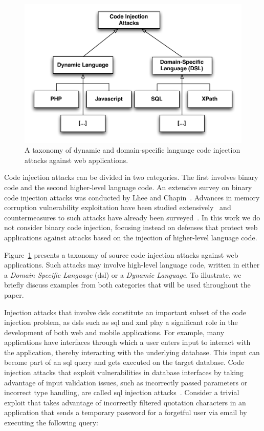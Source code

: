 \documentclass[conference]{IEEEtran}
\begin{document}
\begin{figure}
\begin{center}
\leavevmode
\includegraphics[width=\columnwidth]{attack-tree-uml.pdf}
\end{center}
\caption{\label{fig:taxonomy}A taxonomy of dynamic and domain-specific
language code injection attacks against web applications.}
\end{figure}

Code injection attacks can be divided in two categories. The first
involves binary code and the second higher-level language code. An
extensive survey on binary code injection attacks was conducted by
Lhee and Chapin~\cite{LC03}. Advances in memory corruption vulnerability
exploitation have been studied extensively~\cite{PB04, SPWS13}
and countermeasures to such attacks
have already been surveyed~\cite{YJP12}\cite[Sec. 13.8]{DKZ12}.
In this work
we do not consider binary code injection, focusing instead on defenses
that protect web applications against attacks based on the
injection of higher-level language code.

Figure~\ref{fig:taxonomy} presents a taxonomy of source
code injection attacks against web applications.
Such attacks may involve high-level language code, written in either a
{\it Domain Specific Language} ({\sc dsl}) or a {\it Dynamic Language}.
To illustrate, we briefly discuss examples from both categories
that will be used throughout the paper.

Injection attacks that involve {\sc dsl}s constitute an important
subset of the code injection problem, as {\sc dsl}s such as
{\sc sql} and {\sc xml} play a significant role in the development of
both web and mobile applications. For example, many applications have
interfaces through which a user enters input to interact with the
application, thereby interacting with the underlying database. This
input can become part of an {\sc sql} query and gets executed on the
target database. Code injection attacks that exploit vulnerabilities
in database interfaces by taking advantage of input validation issues,
such as incorrectly passed parameters or incorrect type handling, are
called {\sc sql} injection attacks~\cite{CERT02,MS09,HVO06,SW06}.
Consider a trivial exploit that takes advantage of incorrectly
filtered quotation characters in an application that sends a temporary
password for a forgetful user via email by executing the following
query:
\end{document}
